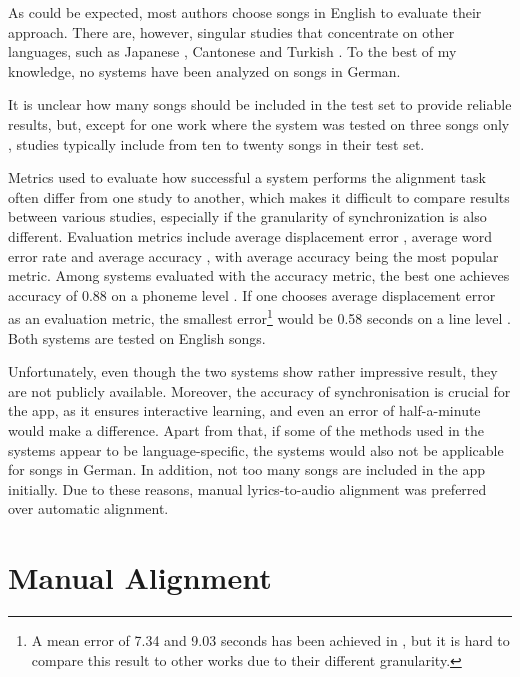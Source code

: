 As could be expected, most authors choose songs in English to evaluate their approach. There are, however, singular studies that concentrate on other languages, such as Japanese \citep{Fujihara.2006, Fujihara.2008}, Cantonese \citep{Wong.2007} and Turkish \citep{Dzhambazov.2016}. To the best of my knowledge, no systems have been analyzed on songs in German.

It is unclear how many songs should be included in the test set to provide reliable results, but, except for one work where the system was tested on three songs only \citep{Iskandar.2006}, studies typically include from ten to twenty songs in their test set.

Metrics used to evaluate how successful a system performs the alignment task often differ from one study to another, which makes it difficult to compare results between various studies, especially if the granularity of synchronization is also different. Evaluation metrics include average displacement error \citep{Wang.2008, Lee.2008, Mesaros.2008}, average word error rate \citep{Iskandar.2006} and average accuracy \citep{Fujihara.2006, Fujihara.2008, Mauch.2012, Dzhambazov.2016}, with average accuracy being the most popular metric. Among systems evaluated with the accuracy metric, the best one achieves accuracy of 0.88 on a phoneme level \citep{Mauch.2012}. If one chooses average displacement error as an evaluation metric, the smallest error\footnote{A mean error of 7.34 and 9.03 seconds has been achieved in \cite{Kruspe.2018}, but it is hard to compare this result to other works due to their different granularity.} would be 0.58 seconds on a line level \citep{Wang.2008}. Both systems are tested on English songs.

Unfortunately, even though the two systems show rather impressive result, they are not publicly available. Moreover, the accuracy of synchronisation is crucial for the app, as it ensures interactive learning, and even an error of  half-a-minute would make a difference. Apart from that, if some of the methods used in the systems appear to be language-specific, the systems would also not be applicable for songs in German. In addition, not too many songs are included in the app initially. Due to these reasons, manual lyrics-to-audio alignment was preferred over automatic alignment.

\section{Manual Alignment}

